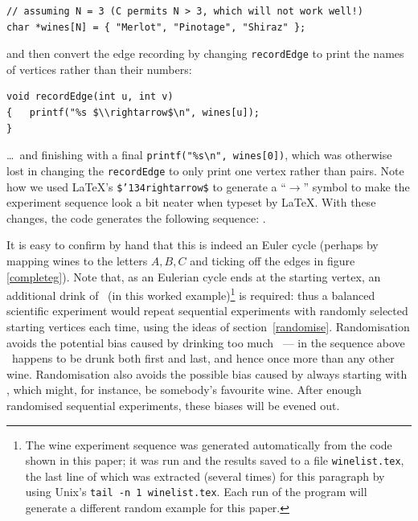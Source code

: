\documentclass[prodmode,acmtecs]{acmsmall} %
\begin{document}
\begin{verbatim}
// assuming N = 3 (C permits N > 3, which will not work well!)
char *wines[N] = { "Merlot", "Pinotage", "Shiraz" }; 
\end{verbatim}

and then convert the edge recording by changing \texttt{recordEdge} to print the names of vertices rather than their numbers: 

\begin{Verbatim}
void recordEdge(int u, int v) 
{   printf("%s $\\rightarrow$\n", wines[u]);
}
\end{Verbatim}

\label{winelist}
\ldots\ and finishing with a final \verb|printf("%s\n", wines[0])|, which was otherwise lost in changing the \verb|recordEdge| to only print one vertex rather than pairs. Note how we used \LaTeX's \texttt{\$\char'134rightarrow\$} to generate a ``$\rightarrow$'' symbol to make the experiment sequence look a bit neater when typeset by \LaTeX\@. With these changes, the code generates the following sequence: \unskip.

It is easy to confirm by hand that this is indeed an Euler cycle (perhaps by mapping wines to the letters $A,B,C$ and ticking off the edges in figure \ref{completeg}). Note that, as an Eulerian cycle ends at the starting vertex, an additional drink of \unskip\ (in this worked example)\footnote{The wine experiment sequence was generated automatically from the code shown in this paper; it was run and the results saved to a file \texttt{winelist.tex}, the last line of which was extracted (several times) for this paragraph by using Unix's \texttt{tail -n 1 winelist.tex}. Each run of the program will generate a different random example for this paper.} is required: thus a balanced scientific experiment would repeat sequential experiments with randomly selected starting vertices each time, using the ideas of section~\ref{randomise}. Randomisation avoids the potential bias caused by drinking too much \unskip\ --- in the sequence above \unskip\ happens to be drunk both first and last, and hence once more than any other wine. Randomisation also avoids the possible bias caused by always starting with \unskip, which might, for instance, be somebody's favourite wine. After enough randomised sequential experiments, these biases will be evened out.
\end{document}
